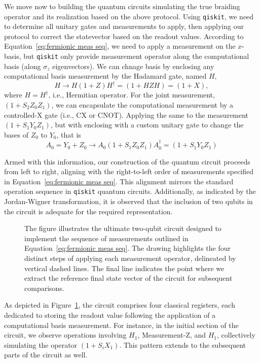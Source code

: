 \documentclass{article}
\begin{document}
\vspace{12pt}
We move now to building the quantum circuits simulating the true braiding operator and its realization based on the above protocol. Using \texttt{qiskit}, we need to determine all unitary gates and measurements to apply, then applying our protocol to correct the statevector based on the readout values. According to Equation~\ref{eq:fermionic meas seq}, we need to apply a measurement on the $ x $-basis, but \texttt{qiskit} only provide measurement operator along the computational basis (along $ \sigma_z $ eigenvectors). We can chnage basis by enclosing any computational basis measurement by the Hadamard gate, named $ H $,
\[
	H \rightarrow H (1 + Z) H^\dagger = (1 + HZH) = (1 + X),
\]
where $ H = H^\dagger $, i.e., Hermitian operator. For the joint measurement, $ (1 + S_2 Z_0 Z_1) $, we can encapsulate the computational measurement by a controlled-X gate (i.e., CX or CNOT). Applying the same to the measurement $ (1 + S_1 Y_0 Z_1) $, but with enclosing with a custom unitary gate to change the bases of $ Z_0 $ to $ Y_0 $, that is
\[
	A_0 = Y_0 + Z_0 \rightarrow A_0(1 + S_1 Z_0 Z_1)A_0^\dagger = (1 + S_1 Y_0 Z_1)
\]

Armed with this information, our construction of the quantum circuit proceeds from left to right, aligning with the right-to-left order of measurements specified in Equation~\ref{eq:fermionic meas seq}. This alignment mirrors the standard operation sequence in \texttt{qiskit} quantum circuits. Additionally, as indicated by the Jordan-Wigner transformation, it is observed that the inclusion of two qubits in the circuit is adequate for the required representation.
\begin{figure}
	\begin{center}
		
	\end{center}
	\caption{The figure illustrates the ultimate two-qubit circuit designed to implement the sequence of measurements outlined in Equation~\ref{eq:fermionic meas seq}. The drawing highlights the four distinct steps of applying each measurement operator, delineated by vertical dashed lines. The final line indicates the point where we extract the reference final state vector of the circuit for subsequent comparisons.}\label{fig:meas q circuit}
\end{figure}
As depicted in Figure~\ref{fig:meas q circuit}, the circuit comprises four classical registers, each dedicated to storing the readout value following the application of a computational basis measurement. For instance, in the initial section of the circuit, we observe operations involving \(H_1\), Measurement-Z, and \(H_1\), collectively simulating the operator \((1 + S_i X_1)\). This pattern extends to the subsequent parts of the circuit as well.
\end{document}
